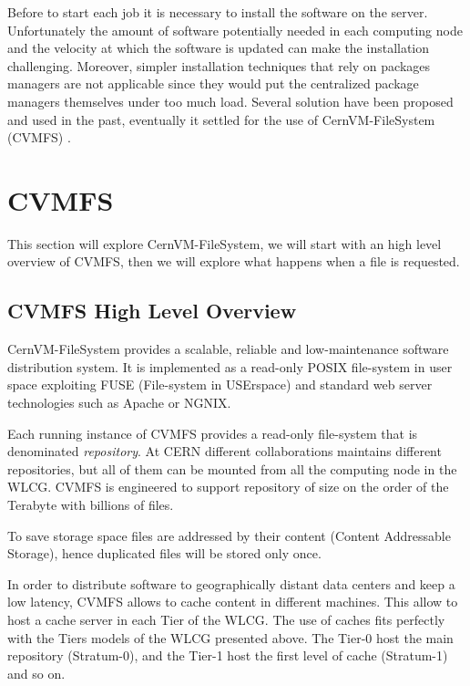 Before to start each job it is necessary to install the software on the server.
Unfortunately the amount of software potentially needed in each computing node
and the velocity at which the software is updated can make the installation
challenging. Moreover, simpler installation techniques that rely on packages
managers are not applicable since they would put the centralized package
managers themselves under too much load. Several solution have been proposed
and used in the past, eventually it settled for the use of CernVM-FileSystem
(CVMFS) \cite{cvmfs}.

\section{CVMFS} \label{sec:cvmfs}

This section will explore CernVM-FileSystem, we will start with an high level
overview of CVMFS, then we will explore what happens when a file is requested.


\subsection{CVMFS High Level Overview}

CernVM-FileSystem \cite{cvmfs} provides a scalable, reliable and
low-maintenance software distribution system. It is implemented as a read-only
POSIX file-system in user space exploiting FUSE (File-system in USErspace)
\cite{fuse} and standard web server technologies such as Apache or NGNIX.

Each running instance of CVMFS provides a read-only file-system that is
denominated \textit{repository}. At CERN different collaborations maintains
different repositories, but all of them can be mounted from all the computing
node in the WLCG. CVMFS is engineered to support repository of size on the
order of the Terabyte with billions of files.

To save storage space files are addressed by their content (Content Addressable
Storage), hence duplicated files will be stored only once.

In order to distribute software to geographically distant data centers and keep
a low latency, CVMFS allows to cache content in different machines. This allow
to host a cache server in each Tier of the WLCG. The use of caches fits
perfectly with the Tiers models of the WLCG presented above. The Tier-0 host
the main repository (Stratum-0), and the Tier-1 host the first level of cache
(Stratum-1) and so on.

